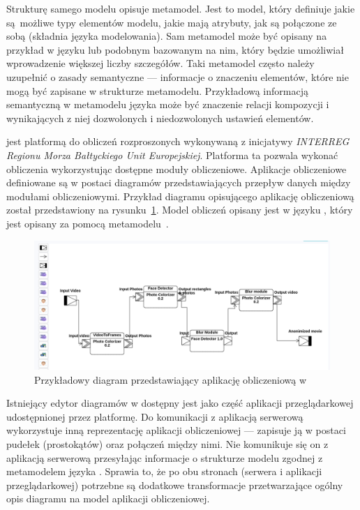 Strukturę samego modelu opisuje metamodel. Jest to model, który definiuje jakie
są~możliwe typy elementów modelu, jakie mają atrybuty, jak są połączone ze
sobą (składnia języka modelowania). Sam metamodel może być opisany na przykład
w języku  lub podobnym
bazowanym na nim, który będzie umożliwiał wprowadzenie większej liczby
szczegółów. Taki metamodel często należy uzupełnić o zasady semantyczne ---
informacje o znaczeniu elementów, które nie mogą być zapisane w strukturze
metamodelu.
Przykładową informacją semantyczną w metamodelu języka  może być
znaczenie relacji kompozycji i wynikających z niej dozwolonych i niedozwolonych
ustawień elementów.

\BalticLSC{} jest platformą do obliczeń rozproszonych wykonywaną z
inicjatywy
\emph{INTERREG Regionu Morza Bałtyckiego Unit Europejskiej}. Platforma ta
pozwala
wykonać obliczenia wykorzystując dostępne moduły obliczeniowe. Aplikacje
obliczeniowe definiowane są w postaci diagramów przedstawiających przepływ
danych między modułami obliczeniowymi. Przykład diagramu opisującego aplikację
obliczeniową został przedstawiony na
rysunku~\ref{rys:przykladowy-diagram-balticlsc}.  Model obliczeń opisany jest w
języku , który jest opisany za pomocą
metamodelu~\cite{cal-metamodel}.

\begin{figure}[!ht]
	\centering

	\includegraphics[width=0.95\linewidth]{./images/balticlsc-example-diagram.png}
	\caption{Przykładowy diagram przedstawiający aplikację obliczeniową w
		\BalticLSC{}}\label{rys:przykladowy-diagram-balticlsc}
\end{figure}

Istniejący edytor diagramów w \BalticLSC{} dostępny jest jako część aplikacji
przeglądarkowej udostępnionej przez platformę. Do komunikacji z aplikacją
serwerową wykorzystuje inną reprezentację aplikacji obliczeniowej --- zapisuje
ją w postaci pudełek (prostokątów) oraz połączeń między nimi. Nie komunikuje
się on z aplikacją serwerową przesyłając informacje o strukturze modelu
zgodnej z metamodelem języka \CAL{}. Sprawia to, że po obu stronach (serwera
i aplikacji przeglądarkowej) potrzebne są dodatkowe transformacje
przetwarzające ogólny opis diagramu na model aplikacji obliczeniowej.

